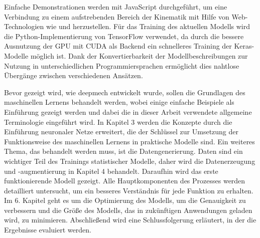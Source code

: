 Einfache Demonstrationen werden mit JavaScript durchgeführt, um eine Verbindung zu einem aufstrebenden Bereich der Kinematik mit Hilfe von Web-Technologien wie  \cite{Goessner2019} und  \cite{Uhlig2019} herzustellen.
Für das Training des aktuellen Modells wird die Python-Implementierung von TensorFlow verwendet, da durch die bessere Ausnutzung der GPU mit CUDA \cite{nvidia2019} als Backend ein schnelleres Training der Keras-Modelle möglich ist.
Dank der Konvertierbarkeit der Modellbeschreibungen zur Nutzung in unterschiedlichen Programmiersprachen ermöglicht dies nahtlose Übergänge zwischen verschiedenen Ansätzen.

Bevor gezeigt wird, wie deepmech entwickelt wurde, sollen die Grundlagen des maschinellen Lernens behandelt werden, wobei einige einfache Beispiele als Einführung gezeigt werden und dabei die in dieser Arbeit verwendete allgemeine Terminologie eingeführt wird.
In Kapitel 3 werden die Konzepte durch die Einführung neuronaler Netze erweitert, die der Schlüssel zur Umsetzung der Funktionsweise des maschinellen Lernens in praktische Modelle sind.
Ein weiteres Thema, das behandelt werden muss, ist die Datengenerierung. Daten sind ein wichtiger Teil des Trainings statistischer Modelle, daher wird die Datenerzeugung und -augmentierung in Kapitel 4 behandelt.
Daraufhin wird das erste funktionierende Modell gezeigt.
Alle Hauptkomponenten des Prozesses werden detailliert untersucht, um ein besseres Verständnis für jede Funktion zu erhalten.
Im 6. Kapitel geht es um die Optimierung des Modells, um die Genauigkeit zu verbessern und die Größe des Modells, das in zukünftigen Anwendungen geladen wird, zu minimieren.
Abschließend wird eine Schlussfolgerung erläutert, in der die Ergebnisse evaluiert werden.
